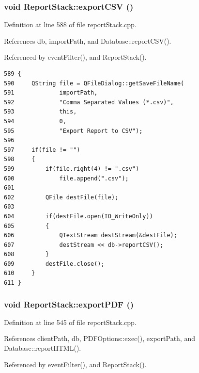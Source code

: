 \hypertarget{classReportStack_k6}{
\subsubsection[exportCSV]{\setlength{\rightskip}{0pt plus 5cm}void Report\-Stack::export\-CSV ()}}
\label{classReportStack_k6}


Definition at line 588 of file report\-Stack.cpp.

References db, import\-Path, and Database::report\-CSV().

Referenced by event\-Filter(), and Report\-Stack().

\footnotesize\begin{verbatim}589 {
590     QString file = QFileDialog::getSaveFileName(
591             importPath,
592             "Comma Separated Values (*.csv)",
593             this,
594             0,
595             "Export Report to CSV");
596     
597     if(file != "")
598     {
599         if(file.right(4) != ".csv")
600             file.append(".csv");
601 
602         QFile destFile(file);
603     
604         if(destFile.open(IO_WriteOnly))
605         {
606             QTextStream destStream(&destFile);
607             destStream << db->reportCSV();
608         }
609         destFile.close();
610     }
611 }
\end{verbatim}\normalsize 


\hypertarget{classReportStack_k5}{
\subsubsection[exportPDF]{\setlength{\rightskip}{0pt plus 5cm}void Report\-Stack::export\-PDF ()}}
\label{classReportStack_k5}


Definition at line 545 of file report\-Stack.cpp.

References client\-Path, db, PDFOptions::exec(), export\-Path, and Database::report\-HTML().

Referenced by event\-Filter(), and Report\-Stack().

